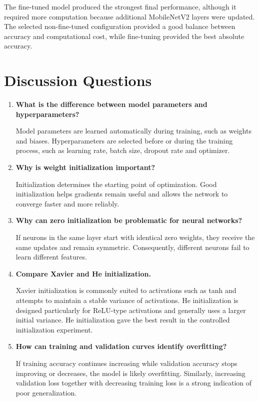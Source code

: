 \documentclass[12pt,a4paper]{article}
\begin{document}
The fine-tuned model produced the strongest final performance, although it
required more computation because additional MobileNetV2 layers were updated.
The selected non-fine-tuned configuration provided a good balance between
accuracy and computational cost, while fine-tuning provided the best absolute
accuracy.

\section{Discussion Questions}

\begin{enumerate}[leftmargin=*]

\item \textbf{What is the difference between model parameters and hyperparameters?}

Model parameters are learned automatically during training, such as weights
and biases. Hyperparameters are selected before or during the training process,
such as learning rate, batch size, dropout rate and optimizer.

\item \textbf{Why is weight initialization important?}

Initialization determines the starting point of optimization. Good
initialization helps gradients remain useful and allows the network to
converge faster and more reliably.

\item \textbf{Why can zero initialization be problematic for neural networks?}

If neurons in the same layer start with identical zero weights, they receive
the same updates and remain symmetric. Consequently, different neurons fail
to learn different features.

\item \textbf{Compare Xavier and He initialization.}

Xavier initialization is commonly suited to activations such as tanh and
attempts to maintain a stable variance of activations. He initialization is
designed particularly for ReLU-type activations and generally uses a larger
initial variance. He initialization gave the best result in the controlled
initialization experiment.

\item \textbf{How can training and validation curves identify overfitting?}

If training accuracy continues increasing while validation accuracy stops
improving or decreases, the model is likely overfitting. Similarly, increasing
validation loss together with decreasing training loss is a strong indication
of poor generalization.


\end{enumerate}
\end{document}
